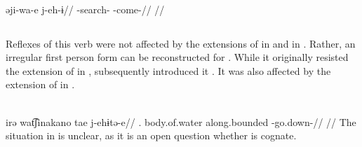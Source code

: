\carijo \parencite[][102]{guerrero2019carijo}\\
\begingl
\gla əji-wa-e j-eh-ɨ//
\glb {}-search- -come-//
\glft {}//
\endgl
\xe

\subsection{ }
\label{sec:godown}
Reflexes of this verb were not affected by the extensions of  in \PTir {} and  in \akuriyo {}.
Rather, an irregular first person form  can be reconstructed for \PTir.
While it originally resisted the extension of  in \PPek, \bakairi subsequently introduced it .
It was also affected by the extension of  in \carijo {}.

\carijo {}\\
\begingl
\gla irə wat͡ʃinakano tae j-ehɨtə-e//
\glb {}. body.of.water along.bounded -go.down-//
\glft {}//
\endgl
\xe
%
The situation in \yukpa is unclear, as it is an open question whether   \parencite{meira2003primeras} is cognate.

